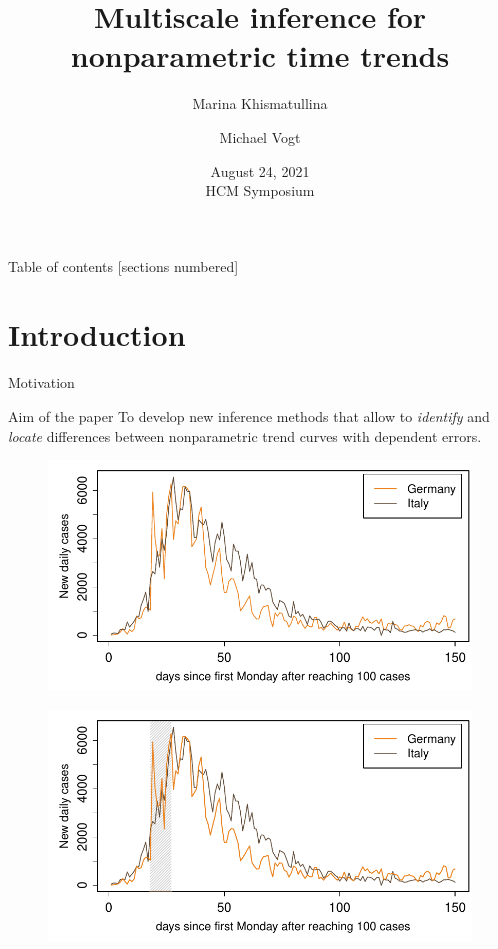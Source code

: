 \documentclass[10pt, handout]{beamer}
\title{Multiscale inference for nonparametric time trends}
\date{August 24, 2021\\ HCM Symposium}
\author{Marina Khismatullina \and Michael Vogt}
\begin{document}
\maketitle

\begin{frame}{Table of contents}
  [sections numbered]
  \tableofcontents[hideallsubsections]
\end{frame}

\section{Introduction}


\begin{frame}{Motivation}

{ \begin{block}{Aim of the paper}
	To develop new inference methods that allow to \textit{identify} and \textit{locate} differences between nonparametric trend curves with dependent errors.
\end{block}}
	{\begin{figure}
    		\centering
    		\includegraphics[height=0.45\textheight]{plots/Germany_and_Italy.pdf}
  	\end{figure}}
	{\onslide<3>
	\vspace{-46,81mm}
	\begin{figure}
    		\centering
    		\includegraphics[height=0.45\textheight]{plots/Germany_and_Italy_1.pdf}

\end{figure}}
\end{frame}
\end{document}
